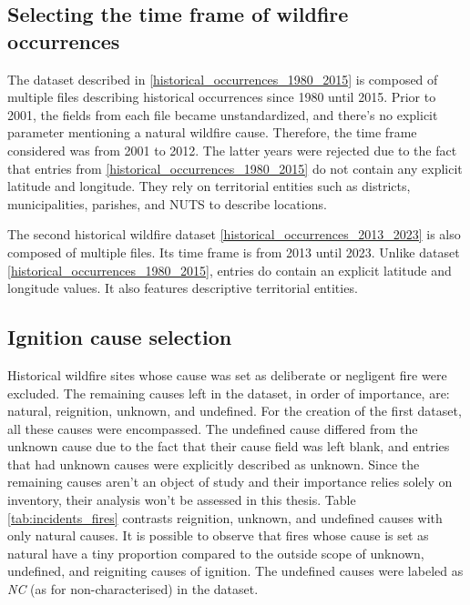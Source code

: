 \subsection{Selecting the time frame of wildfire occurrences}

The dataset described in \ref{historical_occurrences_1980_2015} is composed of multiple files describing historical occurrences since 1980 until 2015. Prior to 2001, the fields from each file became unstandardized, and there's no explicit parameter mentioning a natural wildfire cause. Therefore, the time frame considered was from 2001 to 2012. The latter years were rejected due to the fact that entries from \ref{historical_occurrences_1980_2015} do not contain any explicit latitude and longitude. They rely on territorial entities such as districts, municipalities, parishes, and NUTS to describe locations.

The second historical wildfire dataset \ref{historical_occurrences_2013_2023} is also composed of multiple files. Its time frame is from 2013 until 2023. Unlike dataset \ref{historical_occurrences_1980_2015}, entries do contain an explicit latitude and longitude values. It also features descriptive territorial entities. 

\subsection{Ignition cause selection}
Historical wildfire sites whose cause was set as deliberate or negligent fire were excluded. The remaining causes left in the dataset, in order of importance, are: natural, reignition, unknown, and undefined. For the creation of the first dataset, all these causes were encompassed. The undefined cause differed from the unknown cause due to the fact that their cause field was left blank, and entries that had unknown causes were explicitly described as unknown. Since the remaining causes aren't an object of study and their importance relies solely on inventory, their analysis won't be assessed in this thesis. Table \ref{tab:incidents_fires} contrasts reignition, unknown, and undefined causes with only natural causes. It is possible to observe that fires whose cause is set as natural have a tiny proportion compared to the outside scope of unknown, undefined, and reigniting causes of ignition. The undefined causes were labeled as \textit{NC} (as for non-characterised) in the dataset.



